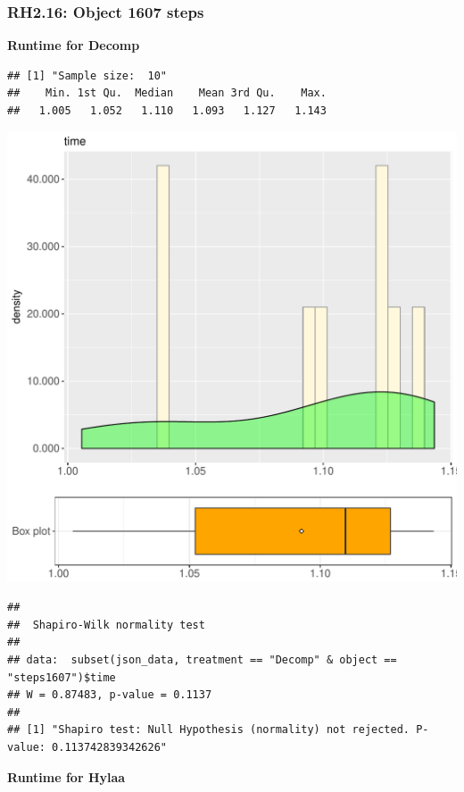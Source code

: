 \documentclass{article}\usepackage[]{graphicx}\usepackage[]{color}
\makeatletter
\def\maxwidth{ %
  \ifdim\Gin@nat@width>\linewidth
    \linewidth
  \else
    \Gin@nat@width
  \fi
}
\newenvironment{kframe}{%
 \def\at@end@of@kframe{}%
 \ifinner\ifhmode%
  \def\at@end@of@kframe{\end{minipage}}%
  \begin{minipage}{\columnwidth}%
 \fi\fi%
 \def\FrameCommand##1{\hskip\@totalleftmargin \hskip-\fboxsep
 \colorbox{shadecolor}{##1}\hskip-\fboxsep
     \hskip-\linewidth \hskip-\@totalleftmargin \hskip\columnwidth}%
 \MakeFramed {\advance\hsize-\width
   \@totalleftmargin\z@ \linewidth\hsize
   \@setminipage}}%
 {\par\unskip\endMakeFramed%
 \at@end@of@kframe}
\newenvironment{knitrout}{}{} %
\makeatother
\begin{document}
\subsubsection{RH2.16: Object 1607 steps}

 \textbf{Runtime for Decomp}
\begin{knitrout}
\color{fgcolor}\begin{kframe}
\begin{verbatim}
## [1] "Sample size:  10"
##    Min. 1st Qu.  Median    Mean 3rd Qu.    Max. 
##   1.005   1.052   1.110   1.093   1.127   1.143
\end{verbatim}
\end{kframe}
\includegraphics[width=\maxwidth]{figure/RH2_Decomp_steps1607-1} 
\begin{kframe}\begin{verbatim}
## 
## 	Shapiro-Wilk normality test
## 
## data:  subset(json_data, treatment == "Decomp" & object == "steps1607")$time
## W = 0.87483, p-value = 0.1137
## 
## [1] "Shapiro test: Null Hypothesis (normality) not rejected. P-value: 0.113742839342626"
\end{verbatim}
\end{kframe}
\end{knitrout}
 \textbf{Runtime for Hylaa}
\end{document}
